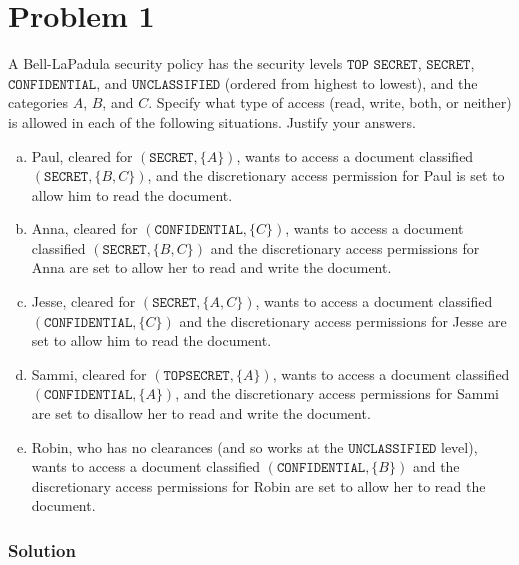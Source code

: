 
\section*{Problem 1}
A Bell-LaPadula security policy has the security levels $\texttt{TOP SECRET}$, $\texttt{SECRET}$, $\texttt{CONFIDENTIAL}$, and $\texttt{UNCLASSIFIED}$ (ordered from highest to lowest), and the categories $A$, $B$, and $C$.
Specify what type of access (read, write, both, or neither) is allowed in each of the following situations.
Justify your answers.

\begin{enumerate}[(a)]
    \item Paul, cleared for $(\texttt{SECRET}, \{ A \})$, wants to access a document classified $(\texttt{SECRET}, \{ B, C \})$, and the discretionary access permission for Paul is set to allow him to read the document.

    \item Anna, cleared for $(\texttt{CONFIDENTIAL}, \{ C \})$, wants to access a document classified $(\texttt{SECRET}, \{ B, C \})$ and the discretionary access permissions for Anna are set to allow her to read and write the document.

    \item Jesse, cleared for $(\texttt{SECRET}, \{ A, C \})$, wants to access a document classified $(\texttt{CONFIDENTIAL}, \{ C \})$ and the discretionary access permissions for Jesse are set to allow him to read the document.

    \item Sammi, cleared for $(\texttt{TOPSECRET}, \{ A \})$, wants to access a document classified $(\texttt{CONFIDENTIAL}, \{ A \})$, and the discretionary access permissions for Sammi are set to disallow her to read and write the document.

    \item Robin, who has no clearances (and so works at the $\texttt{UNCLASSIFIED}$ level), wants to access a document classified $(\texttt{CONFIDENTIAL}, \{ B \})$ and the discretionary access permissions for Robin are set to allow her to read the document.
\end{enumerate}

\subsubsection*{Solution}

